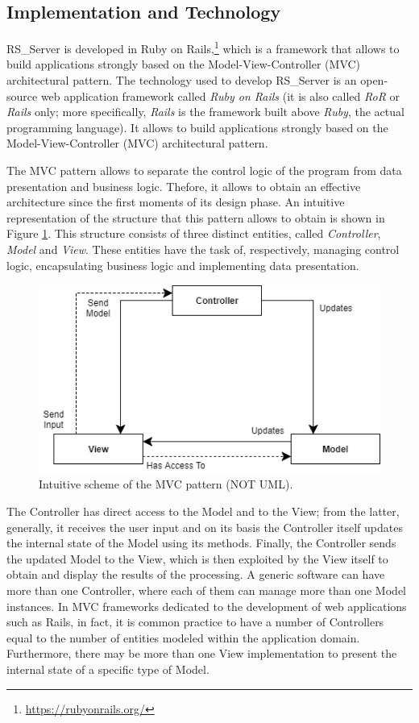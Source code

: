 \documentclass[a4paper, english]{article}
\begin{document}
\subsection{Implementation and Technology}

RS\_Server is developed in Ruby on Rails,\footnote{\url{https://rubyonrails.org/}} which is a framework that allows to build applications strongly based on the Model-View-Controller (MVC) architectural pattern. The technology used to develop RS\_Server is an open-source web application framework called \emph{Ruby on Rails} (it is also called \emph{RoR} or \emph{Rails} only; more specifically, \emph{Rails} is the framework built above \emph{Ruby}, the actual programming language). It allows to build applications strongly based on the Model-View-Controller (MVC) architectural pattern.

The MVC pattern allows to separate the control logic of the program from data  presentation and business logic. Thefore, it allows to obtain an effective architecture since the first moments of its design phase. An intuitive representation of the structure that this pattern allows to obtain is shown in Figure \ref{fig:mvc}. This structure consists of three distinct entities, called \emph{Controller}, \emph{Model} and \emph{View}. These entities have the task of, respectively, managing control logic, encapsulating business logic and implementing data presentation.

\begin{figure}[!tbp]
\centering
\includegraphics[scale=0.7]{figures/mvc.png}
\caption{Intuitive scheme of the MVC pattern (NOT UML).}
\label{fig:mvc}
\end{figure}

The Controller has direct access to the Model and to the View; from the latter, generally, it receives the user input and on its basis the Controller itself updates the internal state of the Model using its methods. Finally, the Controller sends the updated Model to the View, which is then exploited by the View itself to obtain and display the results of the processing. A generic software can have more than one Controller, where each of them can manage more than one Model instances. In MVC frameworks dedicated to the development of web applications such as Rails, in fact, it is common practice to have a number of Controllers equal to the number of entities modeled within the application domain. Furthermore, there may be more than one View implementation to present the internal state of a specific type of Model.
\end{document}
